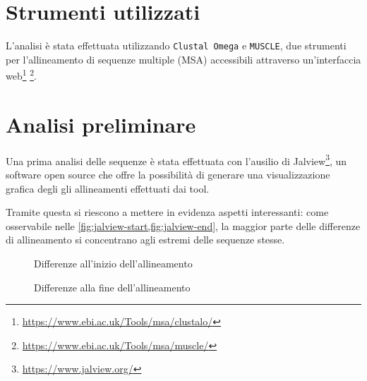 \documentclass[11pt,italian]{article}
\begin{document}
\section{Strumenti utilizzati}
L'analisi è stata effettuata utilizzando \lstinline{Clustal Omega} e \lstinline{MUSCLE}, due strumenti per l'allineamento di sequenze multiple (MSA) accessibili attraverso un'interfaccia web\footnote{\url{https://www.ebi.ac.uk/Tools/msa/clustalo/}} \footnote{\url{https://www.ebi.ac.uk/Tools/msa/muscle/}}.

\section{Analisi preliminare}
Una prima analisi delle sequenze è stata effettuata con l'ausilio di Jalview\footnote{\url{https://www.jalview.org/}}, un software open source che offre la possibilità di generare una visualizzazione grafica degli gli allineamenti effettuati dai tool.

Tramite questa si riescono a mettere in evidenza aspetti interessanti: come osservabile nelle \cref{fig:jalview-start,fig:jalview-end}, la maggior parte delle differenze di allineamento si concentrano agli estremi delle sequenze stesse.

\begin{figure}[H]
  \caption{Differenze all'inizio dell'allineamento}
  \label{fig:jalview-start}
\end{figure}

\begin{figure}[H]
  \caption{Differenze alla fine dell'allineamento}
  \label{fig:jalview-end}
\end{figure}
\end{document}
